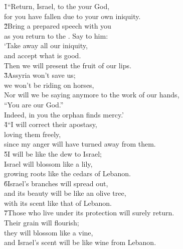 \begin{poetry}
\poeml {}
\v{1}``Return, Israel, to the  your God, \\
\poemll    for you have fallen due to your own iniquity. \\
\poeml \v{2}Bring a prepared speech with you \\
\poemll    as you return to the . Say to him: \\
\poeml `Take away all our iniquity, \\
\poemll    and accept what is good. \\
\poeml Then we will present the fruit of our lips. \\
\poeml \v{3}Assyria won't save us; \\
\poemll    we won't be riding on horses, \\
\poeml Nor will we be saying anymore to the work of our hands, \\
\poemll    ``You are our God.'' \\
\poemlll       Indeed, in you the orphan finds mercy.' \\
\poeml \v{4}``I will correct their apostasy, \\
\poemll    loving them freely, \\
\poemlll       since my anger will have turned away from them. \\
\poeml \v{5}I will be like the dew to Israel; \\
\poemll    Israel will blossom like a lily, \\
\poemlll       growing roots like the cedars of Lebanon. \\
\poeml \v{6}Israel's branches will spread out, \\
\poemll    and its beauty will be like an olive tree, \\
\poemlll       with its scent like that of Lebanon. \\
\poeml \v{7}Those who live under its protection will surely return. \\
\poemll    Their grain will flourish; \\
\poeml they will blossom like a vine, \\
\poemll    and Israel's scent will be like wine from Lebanon. \\

\end{poetry}
